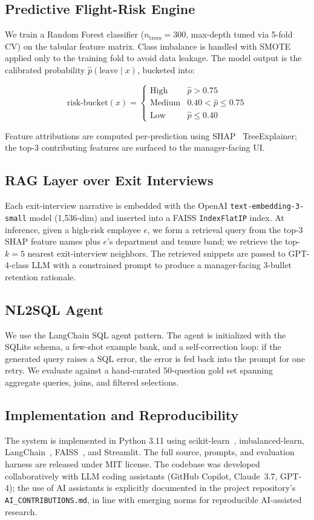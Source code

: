 \documentclass[conference]{IEEEtran}
\begin{document}
\subsection{Predictive Flight-Risk Engine}
We train a Random Forest classifier
($n_{\text{trees}}{=}300$, max-depth tuned via 5-fold CV) on the
tabular feature matrix. Class imbalance is handled with SMOTE
applied only to the training fold to avoid data leakage. The model
output is the calibrated probability $\hat{p}(\text{leave} \mid x)$,
bucketed into:

$$
\text{risk-bucket}(x) = \begin{cases}
\text{High} & \hat{p} > 0.75 \\
\text{Medium} & 0.40 < \hat{p} \le 0.75 \\
\text{Low} & \hat{p} \le 0.40
\end{cases}
$$

Feature attributions are computed per-prediction using
SHAP~\cite{lundberg2017} TreeExplainer; the top-3 contributing
features are surfaced to the manager-facing UI.

\subsection{RAG Layer over Exit Interviews}
Each exit-interview narrative is embedded with the OpenAI
\texttt{text-embedding-3-small} model (1{,}536-dim) and inserted
into a FAISS \texttt{IndexFlatIP} index. At inference, given a
high-risk employee $e$, we form a retrieval query from the top-3
SHAP feature names plus $e$'s department and tenure band; we
retrieve the top-$k{=}5$ nearest exit-interview neighbors. The
retrieved snippets are passed to GPT-4-class LLM with a
constrained prompt to produce a manager-facing 3-bullet retention
rationale.

\subsection{NL2SQL Agent}
We use the LangChain SQL agent pattern. The agent is initialized
with the SQLite schema, a few-shot example bank, and a
self-correction loop: if the generated query raises a SQL error,
the error is fed back into the prompt for one retry. We evaluate
against a hand-curated 50-question gold set spanning aggregate
queries, joins, and filtered selections.

\subsection{Implementation and Reproducibility}
The system is implemented in Python 3.11 using
scikit-learn~\cite{pedregosa2011}, imbalanced-learn,
LangChain~\cite{langchain2023}, FAISS~\cite{johnson2019}, and
Streamlit. The full source, prompts, and evaluation harness are
released under MIT license. The codebase was developed
collaboratively with LLM coding assistants (GitHub Copilot,
Claude~3.7, GPT-4); the use of AI assistants is explicitly
documented in the project repository's
\texttt{AI\_CONTRIBUTIONS.md}, in line with emerging norms for
reproducible AI-assisted research.
\end{document}
